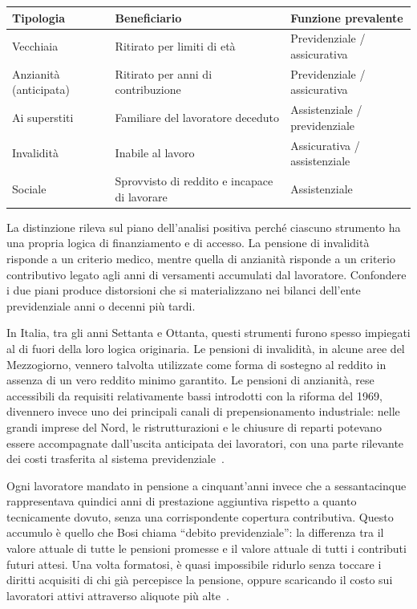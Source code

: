 \begin{center}
\begin{tabularx}{\textwidth}{|l|>{\raggedright\arraybackslash}X|>{\raggedright\arraybackslash}X|}
\hline
Tipologia & Beneficiario & Funzione prevalente \\
\hline
Vecchiaia & Ritirato per limiti di età & Previdenziale / assicurativa \\
\hline
Anzianità (anticipata) & Ritirato per anni di contribuzione & Previdenziale / assicurativa \\
\hline
Ai superstiti & Familiare del lavoratore deceduto & Assistenziale / previdenziale \\
\hline
Invalidità & Inabile al lavoro & Assicurativa / assistenziale \\
\hline
Sociale & Sprovvisto di reddito e incapace di lavorare & Assistenziale \\
\hline
\end{tabularx}
\end{center}

La distinzione rileva sul piano dell'analisi positiva perché ciascuno strumento ha una propria logica di finanziamento e di accesso. La pensione di invalidità risponde a un criterio medico, mentre quella di anzianità risponde a un criterio contributivo legato agli anni di versamenti accumulati dal lavoratore. Confondere i due piani produce distorsioni che si materializzano nei bilanci dell'ente previdenziale anni o decenni più tardi.

In Italia, tra gli anni Settanta e Ottanta, questi strumenti furono spesso impiegati al di fuori della loro logica originaria. Le pensioni di invalidità, in alcune aree del Mezzogiorno, vennero talvolta utilizzate come forma di sostegno al reddito in assenza di un vero reddito minimo garantito. Le pensioni di anzianità, rese accessibili da requisiti relativamente bassi introdotti con la riforma del 1969, divennero invece uno dei principali canali di prepensionamento industriale: nelle grandi imprese del Nord, le ristrutturazioni e le chiusure di reparti potevano essere accompagnate dall’uscita anticipata dei lavoratori, con una parte rilevante dei costi trasferita al sistema previdenziale~\cite{Bosi2018, Ferrera_1996}.

Ogni lavoratore mandato in pensione a cinquant'anni invece che a sessantacinque rappresentava quindici anni di prestazione aggiuntiva rispetto a quanto tecnicamente dovuto, senza una corrispondente copertura contributiva. Questo accumulo è quello che Bosi chiama ``debito previdenziale'': la differenza tra il valore attuale di tutte le pensioni promesse e il valore attuale di tutti i contributi futuri attesi. Una volta formatosi, è quasi impossibile ridurlo senza toccare i diritti acquisiti di chi già percepisce la pensione, oppure scaricando il costo sui lavoratori attivi attraverso aliquote più alte~\cite{Bosi2018}.

